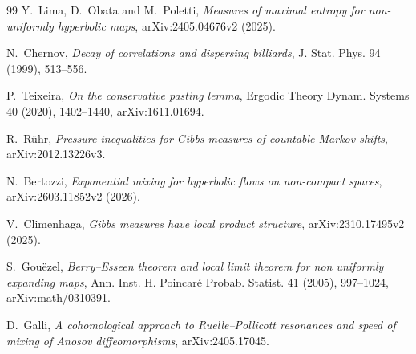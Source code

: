 \documentclass[11pt]{article}
\begin{document}
\begin{thebibliography}{99}
Y.~Lima, D.~Obata and M.~Poletti,
\emph{Measures of maximal entropy for non-uniformly hyperbolic maps},
arXiv:2405.04676v2 (2025).

N.~Chernov,
\emph{Decay of correlations and dispersing billiards},
J. Stat. Phys. 94 (1999), 513--556.

P.~Teixeira,
\emph{On the conservative pasting lemma},
Ergodic Theory Dynam. Systems 40 (2020), 1402--1440,
arXiv:1611.01694.

R.~R\"uhr,
\emph{Pressure inequalities for Gibbs measures of countable Markov shifts},
arXiv:2012.13226v3.

N.~Bertozzi,
\emph{Exponential mixing for hyperbolic flows on non-compact spaces},
arXiv:2603.11852v2 (2026).

V.~Climenhaga,
\emph{Gibbs measures have local product structure},
arXiv:2310.17495v2 (2025).

S.~Gou\"ezel,
\emph{Berry--Esseen theorem and local limit theorem for non uniformly
expanding maps}, Ann. Inst. H. Poincar\'e Probab. Statist. 41 (2005),
997--1024, arXiv:math/0310391.

D.~Galli,
\emph{A cohomological approach to Ruelle--Pollicott resonances and speed of
mixing of Anosov diffeomorphisms}, arXiv:2405.17045.
\end{thebibliography}
\endgroup
\end{document}
